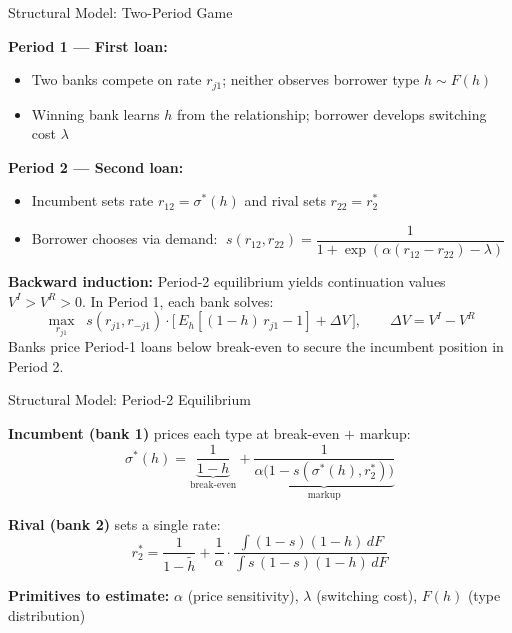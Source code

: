 \documentclass[10pt,aspectratio=169]{beamer}
\begin{document}
\begin{frame}{Structural Model: Two-Period Game}
 
\textbf{Period 1 --- First loan:}
\begin{itemize}
    \item Two banks compete on rate $r_{j1}$; neither observes borrower type $h \sim F(h)$
    \item Winning bank learns $h$ from the relationship; borrower develops switching cost $\lambda$
\end{itemize}

\vspace{0.2cm}
\textbf{Period 2 --- Second loan:}
\begin{itemize}
    \item Incumbent  sets rate $r_{12} = \sigma^*(h)$ and rival sets $r_{22} = r_2^*$
    \item Borrower chooses via demand: $\; s(r_{12}, r_{22}) = \dfrac{1}{1 + \exp(\alpha(r_{12} - r_{22}) - \lambda)}$
\end{itemize}

\vspace{0.2cm}
\textbf{Backward induction:} Period-2 equilibrium yields continuation values $V^I > V^R > 0$. In Period 1, each bank solves:
$$\max_{r_{j1}} \;\; s(r_{j1}, r_{-j1}) \cdot \Big[\,E_h[(1-h)\,r_{j1} - 1] + \Delta V\,\Big], \qquad \Delta V = V^I - V^R$$
Banks price Period-1 loans below break-even to secure the incumbent position in Period 2.
\end{frame}


\begin{frame}{Structural Model: Period-2 Equilibrium}

\textbf{Incumbent (bank 1)} prices each type at break-even $+$ markup:
$$\sigma^*(h) = \underbrace{\frac{1}{1-h}}_{\text{break-even}} + \underbrace{\frac{1}{\alpha\big(1-s(\sigma^*(h), r_2^*)\big)}}_{\text{markup}}$$

\vspace{0.2cm}
\textbf{Rival (bank 2)} sets a single rate:
$$r_2^* = \frac{1}{1 - \tilde{h}} + \frac{1}{\alpha}\cdot\frac{\int (1-s)(1-h)\, dF}{\int s\,(1-s)(1-h)\, dF}$$

\vspace{0.2cm}
\textbf{Primitives to estimate:} $\alpha$ (price sensitivity), $\lambda$ (switching cost), $F(h)$ (type distribution)
\end{frame}
\end{document}
